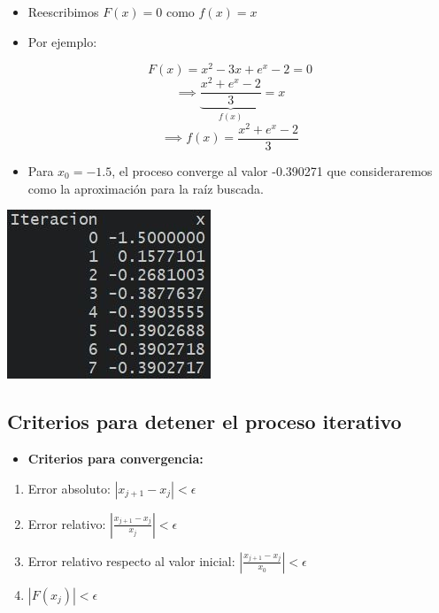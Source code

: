 \documentclass[]{book}
\providecommand{\tightlist}{%
  \setlength{\itemsep}{0pt}\setlength{\parskip}{0pt}}
\begin{document}
\begin{itemize}
\tightlist
\item
  Reescribimos \(F(x) = 0\) como \(f(x) = x\)
\item
  Por ejemplo:
\end{itemize}

\[F(x) = x^2-3x+e^x-2 = 0\]
\[\implies \underbrace{\frac{x^2+e^x-2}{3}}_{f(x)} = x \]
\[\implies f(x)= \frac{x^2+e^x-2}{3}\]

\begin{itemize}
\tightlist
\item
  Para \(x_0 = -1.5\), el proceso converge al valor -0.390271 que consideraremos como la aproximación para la raíz buscada.
\end{itemize}

\begin{center}\includegraphics[width=0.4\linewidth]{Plots/U2/rtdo1} \end{center}

\hypertarget{criterios-para-detener-el-proceso-iterativo}{%
\subsection{Criterios para detener el proceso iterativo}\label{criterios-para-detener-el-proceso-iterativo}}

\begin{itemize}
\tightlist
\item
  \textbf{Criterios para convergencia:}
\end{itemize}

\begin{enumerate}
\def\labelenumi{\arabic{enumi}.}
\item
  Error absoluto: \(|x_{j+1}-x_j| < \epsilon\)
\item
  Error relativo: \(\left|\frac{x_{j+1}-x_j}{x_j}\right| < \epsilon\)
\item
  Error relativo respecto al valor inicial: \(\left|\frac{x_{j+1}-x_j}{x_0}\right| < \epsilon\)
\item
  \(|F(x_j)| < \epsilon\)
\end{enumerate}
\end{document}

